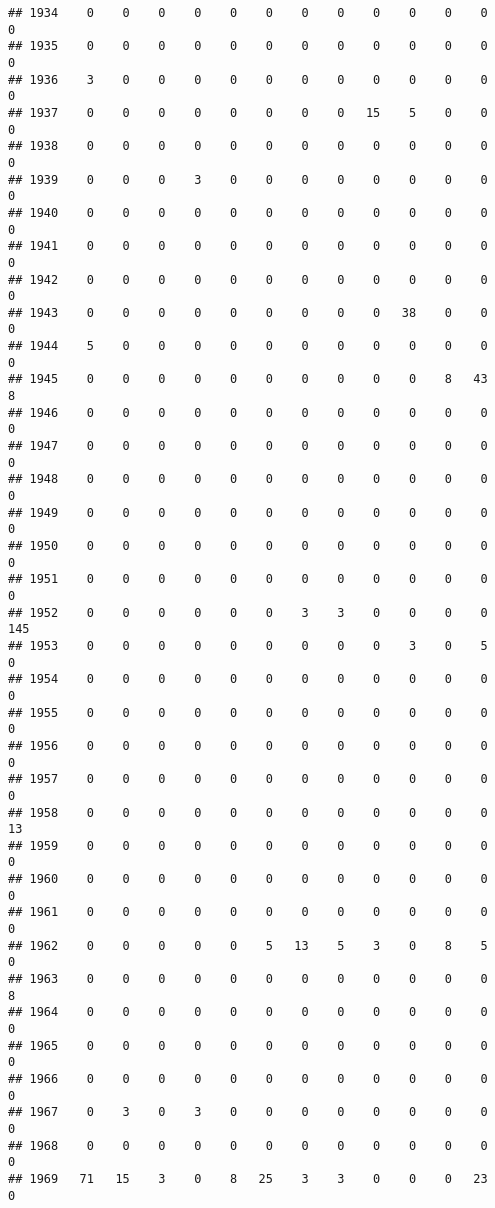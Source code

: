 \documentclass[]{article}
\begin{document}
\begin{verbatim}
## 1934    0    0    0    0    0    0    0    0    0    0    0    0    0
## 1935    0    0    0    0    0    0    0    0    0    0    0    0    0
## 1936    3    0    0    0    0    0    0    0    0    0    0    0    0
## 1937    0    0    0    0    0    0    0    0   15    5    0    0    0
## 1938    0    0    0    0    0    0    0    0    0    0    0    0    0
## 1939    0    0    0    3    0    0    0    0    0    0    0    0    0
## 1940    0    0    0    0    0    0    0    0    0    0    0    0    0
## 1941    0    0    0    0    0    0    0    0    0    0    0    0    0
## 1942    0    0    0    0    0    0    0    0    0    0    0    0    0
## 1943    0    0    0    0    0    0    0    0    0   38    0    0    0
## 1944    5    0    0    0    0    0    0    0    0    0    0    0    0
## 1945    0    0    0    0    0    0    0    0    0    0    8   43    8
## 1946    0    0    0    0    0    0    0    0    0    0    0    0    0
## 1947    0    0    0    0    0    0    0    0    0    0    0    0    0
## 1948    0    0    0    0    0    0    0    0    0    0    0    0    0
## 1949    0    0    0    0    0    0    0    0    0    0    0    0    0
## 1950    0    0    0    0    0    0    0    0    0    0    0    0    0
## 1951    0    0    0    0    0    0    0    0    0    0    0    0    0
## 1952    0    0    0    0    0    0    3    3    0    0    0    0  145
## 1953    0    0    0    0    0    0    0    0    0    3    0    5    0
## 1954    0    0    0    0    0    0    0    0    0    0    0    0    0
## 1955    0    0    0    0    0    0    0    0    0    0    0    0    0
## 1956    0    0    0    0    0    0    0    0    0    0    0    0    0
## 1957    0    0    0    0    0    0    0    0    0    0    0    0    0
## 1958    0    0    0    0    0    0    0    0    0    0    0    0   13
## 1959    0    0    0    0    0    0    0    0    0    0    0    0    0
## 1960    0    0    0    0    0    0    0    0    0    0    0    0    0
## 1961    0    0    0    0    0    0    0    0    0    0    0    0    0
## 1962    0    0    0    0    0    5   13    5    3    0    8    5    0
## 1963    0    0    0    0    0    0    0    0    0    0    0    0    8
## 1964    0    0    0    0    0    0    0    0    0    0    0    0    0
## 1965    0    0    0    0    0    0    0    0    0    0    0    0    0
## 1966    0    0    0    0    0    0    0    0    0    0    0    0    0
## 1967    0    3    0    3    0    0    0    0    0    0    0    0    0
## 1968    0    0    0    0    0    0    0    0    0    0    0    0    0
## 1969   71   15    3    0    8   25    3    3    0    0    0   23    0

\end{verbatim}
\end{document}
